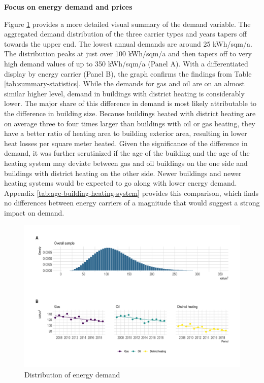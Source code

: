 \documentclass[12pt,twoside]{reedthesis}
\begin{document}
\textbf{Focus on energy demand and prices}

Figure \ref{fig:demand-descriptive-graph} provides a more detailed visual summary of the demand variable. The aggregated demand distribution of the three carrier types and years tapers off towards the upper end. The lowest annual demands are around 25 kWh/sqm/a. The distribution peaks at just over 100 kWh/sqm/a and then tapers off to very high demand values of up to 350 kWh/sqm/a (Panel A). With a differentiated display by energy carrier (Panel B), the graph confirms the findings from Table \ref{tab:summary-statistics}. While the demands for gas and oil are on an almost similar higher level, demand in buildings with district heating is considerably lower. The major share of this difference in demand is most likely attributable to the difference in building size. Because buildings heated with district heating are on average three to four times larger than buildings with oil or gas heating, they have a better ratio of heating area to building exterior area, resulting in lower heat losses per square meter heated. Given the significance of the difference in demand, it was further scrutinized if the age of the building and the age of the heating system may deviate between gas and oil buildings on the one side and buildings with district heating on the other side. Newer buildings and newer heating systems would be expected to go along with lower energy demand. Appendix \ref{tab:age-building-heating-system} provides this comparison, which finds no differences between energy carriers of a magnitude that would suggest a strong impact on demand.
\begin{figure}

{\centering \includegraphics[width=1\linewidth]{figure/demand_descriptive} 

}

\caption{Distribution of energy demand}\label{fig:demand-descriptive-graph}
\end{figure}
\end{document}
